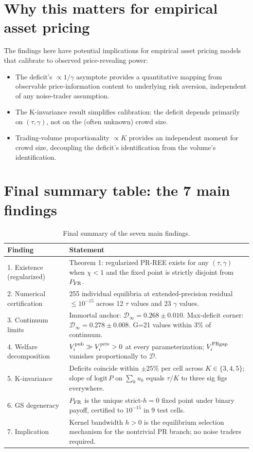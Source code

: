 \documentclass[11pt]{article}
\newcommand{\1}{\mathbf{1}}
\newcommand{\deficit}{\mathcal{D}}
\newcommand{\Vipub}{V_{i}^{\rm pub}}
\newcommand{\Vipriv}{V_{i}^{\rm priv}}
\newcommand{\ViFR}{V_{i}^{\rm FRgap}}
\newcommand{\PFR}{P_{\rm FR}}
\begin{document}
\section{Why this matters for empirical asset pricing}

The findings here have potential implications for empirical asset
pricing models that calibrate to observed price-revealing power:

\begin{itemize}
\item The deficit's $\propto 1/\gamma$ asymptote provides a quantitative
mapping from observable price-information content to underlying risk
aversion, independent of any noise-trader assumption.
\item The K-invariance result simplifies calibration: the deficit
depends primarily on $(\tau, \gamma)$, not on the (often unknown)
crowd size.
\item Trading-volume proportionality $\propto K$ provides an
independent moment for crowd size, decoupling the deficit's identification
from the volume's identification.
\end{itemize}

\section{Final summary table: the 7 main findings}

\begin{table}[H]\centering\small
\begin{tabular}{lp{8cm}}
\toprule
Finding & Statement\\
\midrule
1. Existence (regularized) & Theorem 1: regularized PR-REE exists for any $(\tau, \gamma)$
when $\chi < 1$ and the fixed point is strictly disjoint from $\PFR$.\\
\midrule
2. Numerical certification & 255 individual equilibria at extended-precision
residual $\le 10^{-15}$ across 12 $\tau$ values and 23 $\gamma$ values.\\
\midrule
3. Continuum limits & Immortal anchor: $\deficit_\infty = 0.268 \pm 0.010$.
Max-deficit corner: $\deficit_\infty = 0.278 \pm 0.008$.  G=21 values within 3\% of continuum.\\
\midrule
4. Welfare decomposition & $\Vipub \gg \Vipriv > 0$ at every parameterization;
$\ViFR$ vanishes proportionally to $\deficit$.\\
\midrule
5. K-invariance & Deficits coincide within $\pm 25\%$ per cell across $K \in \{3,4,5\}$;
slope of $\mathrm{logit}\,P$ on $\sum_k u_k$ equals $\tau/K$ to three sig figs everywhere.\\
\midrule
6. GS degeneracy & $\PFR$ is the unique strict-$h{=}0$ fixed point under binary payoff,
certified to $10^{-15}$ in 9 test cells.\\
\midrule
7. Implication & Kernel bandwidth $h > 0$ is the equilibrium selection mechanism for the
nontrivial PR branch; no noise traders required.\\
\bottomrule
\end{tabular}
\caption{Final summary of the seven main findings.}
\end{table}




\end{document}
